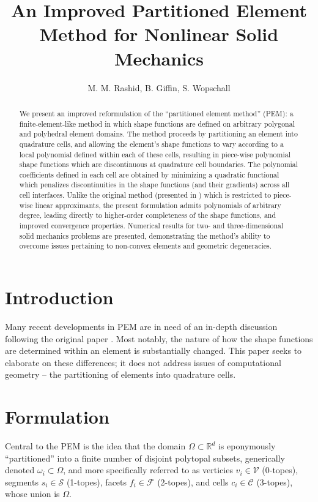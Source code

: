 \documentclass[11pt]{article} %
\title{\textbf{An Improved Partitioned Element Method for Nonlinear Solid Mechanics}}
\author{M. M. Rashid, B. Giffin, S. Wopschall}
\date{}
\begin{document}
\maketitle


\begin{abstract}
We present an improved reformulation of the ``partitioned element method'' (PEM): a finite-element-like method in which shape functions are defined on arbitrary polygonal and polyhedral element domains. The method proceeds by partitioning an element into quadrature cells, and allowing the element's shape functions to vary according to a local polynomial defined within each of these cells, resulting in piece-wise polynomial shape functions which are discontinuous at quadrature cell boundaries. The polynomial coefficients defined in each cell are obtained by minimizing a quadratic functional which penalizes discontinuities in the shape functions (and their gradients) across all cell interfaces. Unlike the original method (presented in \cite{pem}) which is restricted to piece-wise linear approximants, the present formulation admits polynomials of arbitrary degree, leading directly to higher-order completeness of the shape functions, and improved convergence properties. Numerical results for two- and three-dimensional solid mechanics problems are presented, demonstrating the method's ability to overcome issues pertaining to non-convex elements and geometric degeneracies.
\end{abstract}

\section{Introduction}

Many recent developments in PEM are in need of an in-depth discussion following the original paper \cite{pem}. Most notably, the nature of how the shape functions are determined within an element is substantially changed. This paper seeks to elaborate on these differences; it does not address issues of computational geometry -- the partitioning of elements into quadrature cells.

\section{Formulation}

Central to the PEM is the idea that the domain $\Omega \subset \mathbb{R}^d$ is eponymously ``partitioned'' into a finite number of disjoint polytopal subsets, generically denoted $\omega_i \subset \Omega$, and more specifically referred to as verticies $v_i \in \mathcal{V}$ (0-topes), segments $s_i \in \mathcal{S}$ (1-topes), facets $f_i \in \mathcal{F}$ (2-topes), and cells $c_i \in \mathcal{C}$ (3-topes), whose union is $\Omega$.
\end{document}
